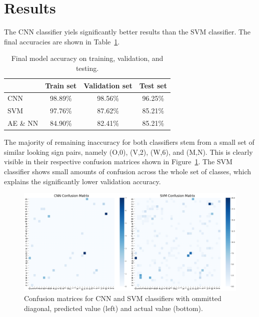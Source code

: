 \documentclass[a4, 10 pt, conference]{ieeeconf}  %
\begin{document}
\section{Results}
\label{sec:results}

The CNN classifier yiels significantly better results than the SVM classifier.
The final accuracies are shown in Table~\ref{tab:classifier_accuracy}.


\begin{table}[H]
  \centering
  \begin{tabular}{|l|c|c|c|}
    \hline
              & Train set & Validation set & Test set \\
    \hline
    CNN       & 98.89\%   & 98.56\%        & 96.25\%  \\
    SVM       & 97.76\%   & 87.62\%        & 85.21\%  \\
    AE \& NN & 84.90\%   & 82.41\%        & 85.21\%  \\
    \hline
  \end{tabular}
  \caption{Final model accuracy on training, validation, and testing.}
  \label{tab:classifier_accuracy}
\end{table}

\vspace{-1.5em}

The majority of remaining inaccuracy for both classifiers stem from a small set of similar
looking sign pairs, namely (O,0), (V,2), (W,6), and (M,N). This is clearly visible
in their respective confusion matrices shown in Figure~\ref{fig:cm}. The SVM
classifier shows small amounts of confusion across the whole set of classes,
which explains the significantly lower validation accuracy.

\begin{figure}[htb]
  \centering
  \includegraphics[width=\linewidth]{../images/cm_comparison.png}
  \caption{Confusion matrices for CNN and SVM classifiers with ommitted diagonal, predicted value (left) and actual value (bottom).}
  \label{fig:cm}
\end{figure}
\end{document}
